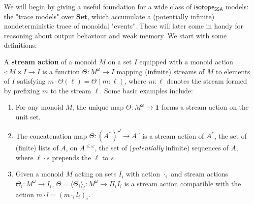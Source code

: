 \documentclass[acmsmall,screen,review]{acmart}
\newcommand{\mb}[1]{\ensuremath{\mathbf{#1}}}
\newcommand{\ms}[1]{\ensuremath{\mathsf{#1}}}
\newcommand{\nats}{\mathbb{N}}
\newcommand{\isotopessa}{\ms{isotope_{SSA}}}
\begin{document}
\label{ssec:trace-monads}

We will begin by giving a useful foundation for a wide class of \isotopessa
models: the "trace models" over \(\mb{Set}\), which accumulate a (potentially
infinite) nondeterministic trace of monoidal "events". These will later come in
handy for reasoning about output behaviour and weak memory. We start with some
definitions:
\begin{definition}
  A \textbf{stream action} of a monoid \(M\) on a set \(I\) equipped with a
  monoid action \(\cdot: M \times I \to I\) is a function \(\Theta: M^\omega \to
  I\) mapping (infinite) streams of \(M\) to elements of \(I\) satisfying
  \(
    m \cdot \Theta(\ell) = \Theta(m \colon \ell)
  \),
  where \(m \colon \ell\) denotes the stream formed by prefixing \(m\) to the
  stream \(\ell\).
  Some basic examples include:
  \begin{enumerate}
    \item For any monoid \(M\), the unique map \(\Theta: M^\omega \to \mathbf{1}\)
    forms a stream action on the unit set.
    \item The concatenation map \(\Theta: (A^*)^\omega \to A^\omega\) is a
    stream action of \(A^*\), the set of (finite) lists of \(A\), on \(A^{\leq
    \omega}\), the set of (\textit{potentially} infinite) sequences of \(A\),
    where \(\ell \cdot s\) prepends the \(\ell\) to \(s\).
    \item Given a monoid \(M\) acting on sets \(I_i\) with action \(\cdot_i\) and
    stream actions \(\Theta_i: M^\omega \to I_i\), \(\Theta =
    \langle\Theta_i\rangle_i: M^\omega \to \Pi_iI_i\) is a stream action
    compatible with the action \(m \cdot l = (m \cdot_i l_i)_i\).
  \end{enumerate}
\end{definition}
\end{document}
